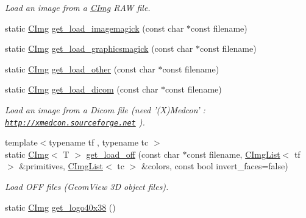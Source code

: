 \begin{DoxyCompactItemize}
\begin{DoxyCompactList}\small\item\em Load an image from a \hyperlink{structcimg__library_1_1_c_img}{CImg} RAW file. \item\end{DoxyCompactList}\item 
static \hyperlink{structcimg__library_1_1_c_img}{CImg} \hyperlink{structcimg__library_1_1_c_img_ad982fff24870aac6b8c55a5564969b5d}{get\_\-load\_\-imagemagick} (const char $\ast$const filename)
\item 
static \hyperlink{structcimg__library_1_1_c_img}{CImg} \hyperlink{structcimg__library_1_1_c_img_a494cfc018d563a30fd1ea69097ed0c19}{get\_\-load\_\-graphicsmagick} (const char $\ast$const filename)
\item 
static \hyperlink{structcimg__library_1_1_c_img}{CImg} \hyperlink{structcimg__library_1_1_c_img_aa6f1fd75110bfd31c1ac72f912997b7a}{get\_\-load\_\-other} (const char $\ast$const filename)
\item 
\hypertarget{structcimg__library_1_1_c_img_a9a48fd037190ca8426c1078f4c18cedb}{
static \hyperlink{structcimg__library_1_1_c_img}{CImg} \hyperlink{structcimg__library_1_1_c_img_a9a48fd037190ca8426c1078f4c18cedb}{get\_\-load\_\-dicom} (const char $\ast$const filename)}
\label{structcimg__library_1_1_c_img_a9a48fd037190ca8426c1078f4c18cedb}

\begin{DoxyCompactList}\small\item\em Load an image from a Dicom file (need '(X)Medcon' : \href{http://xmedcon.sourceforge.net}{\tt http://xmedcon.sourceforge.net} ). \item\end{DoxyCompactList}\item 
\hypertarget{structcimg__library_1_1_c_img_aed9b8af2ab569c6b1cfbd41b15553900}{
{\footnotesize template$<$typename tf , typename tc $>$ }\\static \hyperlink{structcimg__library_1_1_c_img}{CImg}$<$ T $>$ \hyperlink{structcimg__library_1_1_c_img_aed9b8af2ab569c6b1cfbd41b15553900}{get\_\-load\_\-off} (const char $\ast$const filename, \hyperlink{structcimg__library_1_1_c_img_list}{CImgList}$<$ tf $>$ \&primitives, \hyperlink{structcimg__library_1_1_c_img_list}{CImgList}$<$ tc $>$ \&colors, const bool invert\_\-faces=false)}
\label{structcimg__library_1_1_c_img_aed9b8af2ab569c6b1cfbd41b15553900}

\begin{DoxyCompactList}\small\item\em Load OFF files (GeomView 3D object files). \item\end{DoxyCompactList}\item 
\hypertarget{structcimg__library_1_1_c_img_a04d6bb2563befb71032a6ea2c53ec494}{
static \hyperlink{structcimg__library_1_1_c_img}{CImg} \hyperlink{structcimg__library_1_1_c_img_a04d6bb2563befb71032a6ea2c53ec494}{get\_\-logo40x38} ()}
\label{structcimg__library_1_1_c_img_a04d6bb2563befb71032a6ea2c53ec494}


\end{DoxyCompactItemize}
